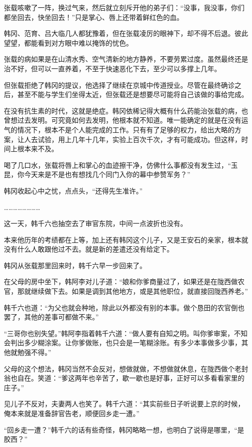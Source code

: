 张载咳嗽了一阵，换过气来，然后就立刻斥开他的弟子们：“没事，我没事，你们都坐回去，快坐回去！”只是掌心、唇上还带着鲜红色的血。

韩冈、范育、吕大临几人都犹豫着，但在张载凌厉的眼神下，却不得不后退。彼此望望，都能看到对方眼中难以掩饰的忧色。

张载的病如果是在山清水秀、空气清新的地方静养，不要劳累过度。虽然最终还是治不好，但可以一直养着，不至于快速恶化下去，至少可以多撑上几年。

但张载拒绝了韩冈的提议，他选择了继续在京城中传道授业。尽管在最终确诊之后，甚至不能与学生们坐得太近，但张载还是想要尽可能将自己该做的事给完成。

在没有抗生素的时代，这就是绝症。韩冈依稀记得大概有什么药能治张载的病，也曾想过去发明。可究竟如何去发明，他根本就不知道。唯一能确定的就是在没有运气的情况下，根本不是个人能完成的工作。只有有了足够的权力，给出大略的方案，让人去试验，用上几年十几年，实验上百次千次，才有可能成功。但这样，时间上根本来不及。

喝了几口水，张载将唇上和掌心的血迹擦干净，仿佛什么事都没有发生过，“玉昆，你今天来是不是也有想找几个同门入你的幕中参赞军务？”

韩冈收起心中之忧，点点头，“还得先生准许。”

……………………

这一天，韩千六也抽空去了审官东院，中间一点波折也没有。

本来他历年的考绩都在上等，加上还有韩冈这个儿子，又是王安石的亲家，根本就没有什么人敢跟他过不去。就是新的差遣还没有给定下。

韩冈从张载那里回来时，韩千六早一步回来了。

在父母的房中坐下，韩阿李对儿子道：“娘和你爹商量过了，如果还是在陇西做农官，那就继续做下去。如果是调到其他地方，或是其他职位，就直接回陇西养老。”

韩千六也道：“为父也就会种地，除此以外都没有别的本事。做个恳田的农官倒也罢了，其他的差事可都做不来。”

“三哥你也别失望。”韩阿李指着韩千六道：“做人要有自知之明。叫你爹审案，不知会判出多少糊涂案。让你爹做账，也只会是一笔糊涂账。有多少本事做多少事，其他就勉强不得。”

父母的这个想法，韩冈当然不会反对，想做就做，不想做就休息，在陇西做个老封翁也自在。笑道：“爹这两年也辛苦了，歇一歇也是好事，正好可以多看看家里的庄子。”

见儿子不反对，夫妻两人也笑了。韩千六道：“其实前些日子听说要上京的时候，俺本来就是准备辞官告老，顺便回乡走一遭。”

“回乡走一遭？”韩千六的话有些奇怪，韩冈略略一想，也明白了说得是哪里，“是胶西？”

